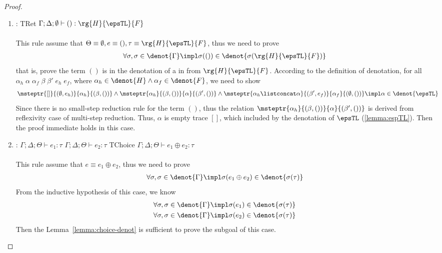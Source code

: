 \begin{proof}
\begin{enumerate}[label=Case]
\item:
{\footnotesize
\mprooftr{35mm}
{}
{TRet}
{$\Gamma; \Delta; \emptyset \vdash () : \rg{H}{\epsTL}{F}$}
\ \\ \ \\}
This rule assume that $\Theta \equiv \emptyset, e \equiv (), \tau \equiv \rg{H}{\epsTL}{F}$, thus we need to prove
{\footnotesize\begin{align*}
    \forall \sigma, \sigma \in \denot{\Gamma} \impl \sigma(()) \in \denot{\sigma(\rg{H}{\epsTL}{F})}
\end{align*}}\noindent
that is, prove the term $()$ is in the denotation of a \PAT in from $\rg{H}{\epsTL}{F}$. According to the definition of \PAT denotation, for all$\alpha_h\;\alpha\;\alpha_f\;\beta\;\beta'\;e_h\;e_f$, where $\alpha_h \in \denot{H} \land \alpha_f \in \denot{F}$, we need to show
{\footnotesize\begin{align*}
&\msteptr{[]}{(\emptyset, e_h)}{\alpha_h}{(\beta, ())} 
\land \msteptr{\alpha_h}{(\beta, ())}{\alpha}{(\beta', ())}
\land \msteptr{\alpha_h \listconcat \alpha }{(\beta', e_f)}{\alpha_f}{(\emptyset, ())} \impl \alpha \in \denot{\epsTL}
\end{align*}}\noindent
Since there is no small-step reduction rule for the term $()$, thus the relation $\msteptr{\alpha_h}{(\beta, ())}{\alpha}{(\beta', ())}$ is derived from reflexivity case of multi-step reduction. Thus, $\alpha$ is empty trace $[]$, which included by the denotation of $\epsTL$ (\autoref{lemma:espTL}). Then the proof immediate holds in this case.

\item:
{\footnotesize
\mprooftr{21mm}
{
$\Gamma; \Delta; \Theta \vdash e_1 : \tau$ \quad $\Gamma; \Delta; \Theta \vdash e_2 : \tau$
 }
{TChoice}
{$\Gamma; \Delta; \Theta \vdash e_1 \oplus e_2 : \tau$}
\ \\ \ \\}
This rule assume that $e \equiv e_1 \oplus e_2$, thus we need to prove
{\footnotesize\begin{align*}
    \forall \sigma, \sigma \in \denot{\Gamma} \impl \sigma(e_1 \oplus e_2) \in \denot{\sigma(\tau)}
\end{align*}}\noindent
From the inductive hypothesis of this case, we know
{\footnotesize\begin{align*}
    &\forall \sigma, \sigma \in \denot{\Gamma} \impl \sigma(e_1) \in \denot{\sigma(\tau)}
    \\&\forall \sigma, \sigma \in \denot{\Gamma} \impl \sigma(e_2) \in \denot{\sigma(\tau)}
\end{align*}}\noindent
Then the Lemma~\ref{lemma:choice-denot} is sufficient to prove the subgoal of this case.


\end{enumerate}
\end{proof}
